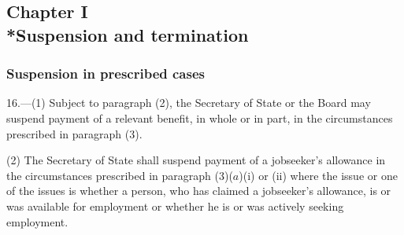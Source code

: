 \documentclass[12pt,a4paper]{article}
\begin{document}
\subsection[Chapter I --- Suspension and termination]{Chapter I\\*Suspension and termination}

\subsubsection[16. Suspension in prescribed cases]{Suspension in prescribed cases}

\renewcommand\parthead{--- Part III Chapter I}

16.—(1) Subject to paragraph (2), the Secretary of State 
or the Board  %
may suspend payment of a relevant benefit, in whole or in part, in the circumstances prescribed in paragraph (3).

(2) The Secretary of State shall suspend payment of a jobseeker’s allowance in the circumstances prescribed in paragraph (3)($a$)(i) or (ii) where the issue or one of the issues is whether a person, who has claimed a jobseeker’s allowance, is or was available for employment or whether he is or was actively seeking employment.
\end{document}
